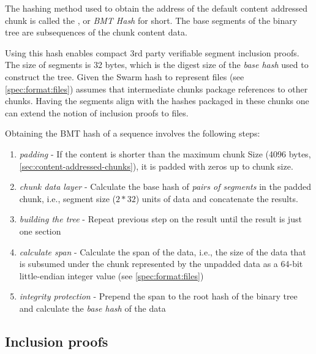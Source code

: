 The hashing method used to obtain the address of the default content addressed chunk is called the , or \emph{BMT Hash} for short. The base segments of the binary tree are subsequences of the chunk content data. 

Using this hash enables compact 3rd party verifiable segment inclusion proofs.
The size of segments is 32  bytes, which is the digest size of the \emph{base hash} used to construct the tree. 
Given the Swarm hash to represent files (see \ref{spec:format:files}) assumes that intermediate chunks package references to other chunks. Having the segments align with the hashes packaged in these chunks one can extend the notion of inclusion proofs to files. 

Obtaining the BMT hash of a sequence involves the following steps:

\begin{enumerate}
\item \emph{padding} - If the content is shorter than the maximum chunk Size  (4096 bytes, \ref{sec:content-addressed-chunks}), it is padded with zeros up to chunk size.
\item \emph{chunk data layer} - Calculate the base hash of \emph{pairs of segments} in the padded chunk, i.e., segment size ($2 * 32$) units of data and concatenate the results.
\item \emph{building the tree} - Repeat previous step on the result until the result is just one section
\item \emph{calculate span} - Calculate the span of the data, i.e., the size of the data that is subsumed under the chunk represented by the unpadded data as a 64-bit little-endian integer value (see  \ref{spec:format:files})
\item \emph{integrity protection} - Prepend the span to the root hash of the binary tree and calculate the \emph{base hash} of the data
\end{enumerate}

\subsection{Inclusion proofs}
